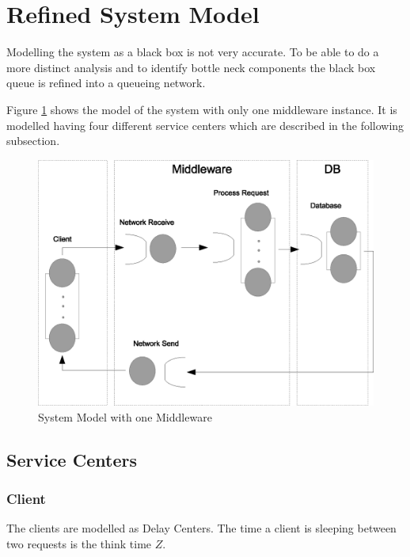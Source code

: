 \documentclass[a4paper]{article}
\begin{document}
\section{Refined System Model}
\label{sec:RefinedSystemModel}

Modelling the system as a black box is not very accurate. To be able to do a more distinct analysis and to identify bottle neck components the black box queue is refined into a queueing network.

Figure \ref{fig:systemmodel-singlebroker} shows the model of the system with only one middleware instance. It is modelled having four different service centers which are described in the following subsection.


\begin{figure}[H]
	\begin{center}
    \includegraphics[scale=0.6]{../drawings-ms2/systemmodel-singlebroker.eps}
  \end{center}
  \caption{System Model with one Middleware}
  \label{fig:systemmodel-singlebroker}
\end{figure}


\subsection{Service Centers}

\subsubsection{Client}
The clients are modelled as Delay Centers. The time a client is sleeping between two requests is the think time $Z$.
\end{document}
